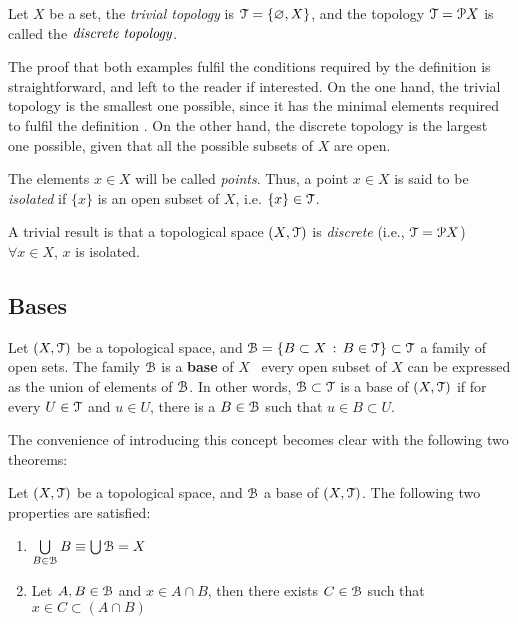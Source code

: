 \documentclass[12pt,spanish]{memoir}
\begin{document}
\begin{example}
Let $X$ be a set, the \emph{trivial topology} is $\EuScript{T}=\{\varnothing, X\}$, and the topology $\EuScript{T}=\EuScript{P} X$ is called the $\emph{discrete topology}$.
\end{example}

The proof that both examples fulfil the conditions required by the definition  is straightforward, and left to the reader if interested. On the one hand, the trivial topology is the smallest one possible, since it has the minimal elements required to fulfil the definition . On the other hand, the discrete topology is the largest one possible, given that all the possible subsets of $X$ are open.

\begin{definition}
The elements $x\in X$ will be called \emph{points}. Thus, a point $x\in X$ is said to be \emph{isolated} if $\{x\}$ is an open subset of $X$, i.e. $\{x\}\in \EuScript{T}$. 
\end{definition} 

\begin{remark} 
A trivial result is that a topological space $(X,\EuScript{T})$ is \emph{discrete} (i.e., $\EuScript{T}=\EuScript{P} X$) \iff\ $\forall x\in X$, $x$ is isolated.
\end{remark}

\subsection{Bases}

\begin{definition}
Let $(X, \EuScript{T})$ be a topological space, and $\EuScript{B} = \{B \subset X\,:\, B \in \EuScript{T}\}\subset\EuScript{T}$ a family of open sets. The family $\EuScript{B}$ is a \textbf{base} of $X$ \iff\, every open subset of $X$ can be expressed as the union of elements of $\EuScript{B}$. In other words, $\EuScript{B}\subset\EuScript{T}$ is a base of $(X,\EuScript{T})$ if for every $U\in\EuScript{T}$ and $u\in U$, there is a $B\in \EuScript{B}$ such that $u\in B\subset U$.
\label{def:base}
\end{definition}

The convenience of introducing this concept becomes clear with the following two theorems:

\begin{theorem}
Let $(X, \EuScript{T})$ be a topological space, and $\EuScript{B}$ a base of $(X, \EuScript{T})$.  The following two properties are satisfied: 
\begin{enumerate}
\item $\bigcup\limits_{B\in\EuScript{B}} B \equiv \bigcup\EuScript{B} = X$
\item Let $A, B\in \EuScript{B}$ and $x\in A\cap B$, then there exists $C\in \EuScript{B}$ such that $x\in C\subset (A\cap B)$
\end{enumerate}
\end{theorem}
\end{document}
